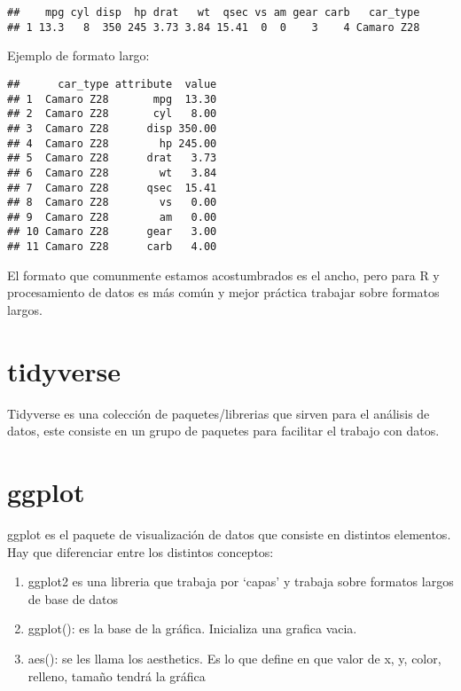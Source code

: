 \documentclass[]{book}
\newenvironment{Shaded}{\begin{snugshade}}{\end{snugshade}}
\newcommand{\KeywordTok}[1]{\textcolor[rgb]{0.13,0.29,0.53}{\textbf{#1}}}
\newcommand{\NormalTok}[1]{#1}
\newcommand{\OperatorTok}[1]{\textcolor[rgb]{0.81,0.36,0.00}{\textbf{#1}}}
\newcommand{\StringTok}[1]{\textcolor[rgb]{0.31,0.60,0.02}{#1}}
\providecommand{\tightlist}{%
  \setlength{\itemsep}{0pt}\setlength{\parskip}{0pt}}
\begin{document}
\begin{verbatim}
##    mpg cyl disp  hp drat   wt  qsec vs am gear carb   car_type
## 1 13.3   8  350 245 3.73 3.84 15.41  0  0    3    4 Camaro Z28
\end{verbatim}

Ejemplo de formato largo:

\begin{Shaded}
\end{Shaded}

\begin{verbatim}
##      car_type attribute  value
## 1  Camaro Z28       mpg  13.30
## 2  Camaro Z28       cyl   8.00
## 3  Camaro Z28      disp 350.00
## 4  Camaro Z28        hp 245.00
## 5  Camaro Z28      drat   3.73
## 6  Camaro Z28        wt   3.84
## 7  Camaro Z28      qsec  15.41
## 8  Camaro Z28        vs   0.00
## 9  Camaro Z28        am   0.00
## 10 Camaro Z28      gear   3.00
## 11 Camaro Z28      carb   4.00
\end{verbatim}

El formato que comunmente estamos acostumbrados es el ancho, pero para R y procesamiento de datos es más común y mejor práctica trabajar sobre formatos largos.

\hypertarget{tidyverse}{%
\section{tidyverse}\label{tidyverse}}

Tidyverse es una colección de paquetes/librerias que sirven para el análisis de datos, este consiste en un grupo de paquetes para facilitar el trabajo con datos.

\hypertarget{ggplot}{%
\section{ggplot}\label{ggplot}}

ggplot es el paquete de visualización de datos que consiste en distintos elementos. Hay que diferenciar entre los distintos conceptos:

\begin{enumerate}
\def\labelenumi{\arabic{enumi}.}
\tightlist
\item
  ggplot2 es una libreria que trabaja por `capas' y trabaja sobre formatos largos de base de datos
\item
  ggplot(): es la base de la gráfica. Inicializa una grafica vacia.
\item
  aes(): se les llama los aesthetics. Es lo que define en que valor de x, y, color, relleno, tamaño tendrá la gráfica
\end{enumerate}
\end{document}
